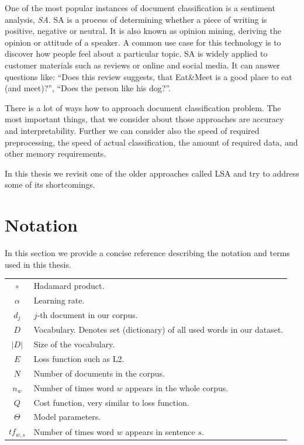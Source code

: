     One of the most popular instances of document classification is a sentiment analysis, \emph{SA}.
    SA is a process of determining whether a piece of writing is positive, negative or neutral.
    It is also known as opinion mining, deriving the opinion or attitude of a speaker. 
    A common use case for this technology is to discover how people feel about a particular topic.
    SA is widely applied to customer materials such as reviews or online and social media.
    It can answer questions like: ``Does this review suggests, that Eat\&Meet is a good place to eat (and meet)?'', ``Does the person like his dog?''.
    
    There is a lot of ways how to approach document classification problem. 
    The most important things, that we consider about those approaches are accuracy and interpretability.
    Further we can consider also the speed of required preprocessing, the speed of actual classification, the amount of required data, and other memory requirements. 
    
    In this thesis we revisit one of the older approaches called LSA and try to address some of its shortcomings.
    

\section{Notation}

    In this section we provide a concise reference describing the notation and terms used in this thesis.
    
    \begin{table}[h]
        \centering
        \begin{tabular}{c l}
            $\circ$ & Hadamard product. \\
            $\alpha$ & Learning rate. \\
            $d_j$ & $j$-th document in our corpus.\\
            $D$ & Vocabulary. Denotes set (dictionary) of all used words in our dataset. \\
            $|D|$ & Size of the vocabulary. \\
            $E$ & Loss function such as L2.\\
            $N$ & Number of documents in the corpus. \\
            $n_w$ & Number of times word $w$ appears in the whole corpus. \\
            $Q$ & Cost function, very similar to loss function.\\
            $\Theta$ & Model parameters.\\
            $tf_{w,s}$ & Number of times word $w$ appears in sentence $s$. \\
            
        \end{tabular}
    \end{table}
    
